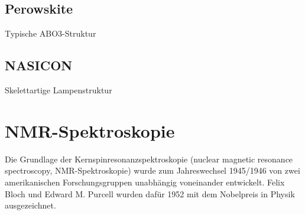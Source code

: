 \documentclass[a4paper, 11pt, headsepline,footsepline,twoside,abstract]{scrbook}
\begin{document}
\subsection{Perowskite}
 Typische ABO3-Struktur
\subsection{NASICON}
 Skelettartige Lampenstruktur
\section{NMR-Spektroskopie}
Die Grundlage der Kernspinresonanzspektroskopie (nuclear magnetic resonance spectroscopy, NMR-Spektroskopie) wurde zum Jahreswechsel 1945/1946 von zwei amerikanischen Forschungsgruppen unabhängig voneinander entwickelt. Felix Bloch und Edward M. Purcell wurden dafür 1952 mit dem Nobelpreis in Physik ausgezeichnet.
\\\\
\end{document}
